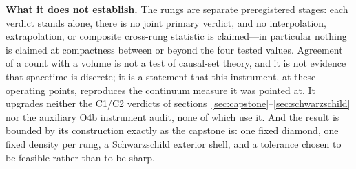 \textbf{What it does not establish.} The rungs are separate preregistered
stages: each verdict stands alone, there is no joint primary verdict, and no
interpolation, extrapolation, or composite cross-rung statistic is
claimed---in particular nothing is claimed at compactness between or beyond
the four tested values. Agreement of a count with a volume is not a test of
causal-set theory, and it is not evidence that spacetime is discrete; it is
a statement that this instrument, at these operating points, reproduces the
continuum measure it was pointed at. It upgrades neither the C1/C2 verdicts
of sections~\ref{sec:capstone}--\ref{sec:schwarzschild} nor the auxiliary
O4b instrument audit, none of which use it. And the result is bounded by its
construction exactly as the capstone is: one fixed diamond, one fixed
density per rung, a Schwarzschild exterior shell, and a tolerance chosen to
be feasible rather than to be sharp.
